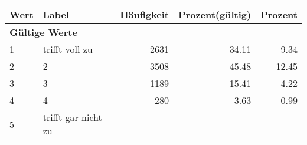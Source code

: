      \begin{longtable}{lXrrr}
     \toprule
     \textbf{Wert} & \textbf{Label} & \textbf{Häufigkeit} & \textbf{Prozent(gültig)} & \textbf{Prozent} \\
     \endhead
     \midrule
     \multicolumn{5}{l}{\textbf{Gültige Werte}}\\

     1 &
     \multicolumn{1}{X}{ trifft voll zu   } &


       \num{2631} &
       \num[round-mode=places,round-precision=2]{34.11} &
         \num[round-mode=places,round-precision=2]{9.34} \\

     2 &
     \multicolumn{1}{X}{ 2   } &


       \num{3508} &
       \num[round-mode=places,round-precision=2]{45.48} &
         \num[round-mode=places,round-precision=2]{12.45} \\

     3 &
     \multicolumn{1}{X}{ 3   } &


       \num{1189} &
       \num[round-mode=places,round-precision=2]{15.41} &
         \num[round-mode=places,round-precision=2]{4.22} \\

     4 &
     \multicolumn{1}{X}{ 4   } &


       \num{280} &
       \num[round-mode=places,round-precision=2]{3.63} &
         \num[round-mode=places,round-precision=2]{0.99} \\

     5 &
     \multicolumn{1}{X}{ trifft gar nicht zu   } &



\end{longtable}
